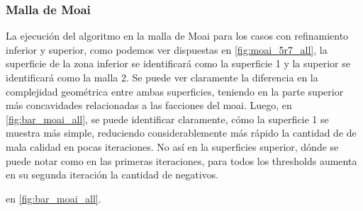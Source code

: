 \subsubsection{Malla de Moai}

La ejecución del algoritmo en la malla de Moai para los casos con refinamiento inferior y superior, como podemos ver dispuestas en \autoref{fig:moai_5r7_all}, la superficie de la zona inferior se identificará como la superficie 1 y la superior se identificará como la malla 2. Se puede ver claramente la diferencia en la complejidad geométrica entre ambas superficies, teniendo en la parte superior más concavidades relacionadas a las facciones del moai. Luego, en \autoref{fig:bar_moai_all}, se puede identificar claramente, cómo la superficie 1 se muestra más simple, reduciendo considerablemente más rápido la cantidad de \elements{} de mala calidad en pocas iteraciones.
No así en la superficies superior, dónde se puede notar como en las primeras iteraciones, para todos los thresholds aumenta en su segunda iteración la cantidad de \elements{} negativos.

en \autoref{fig:bar_moai_all}. 

